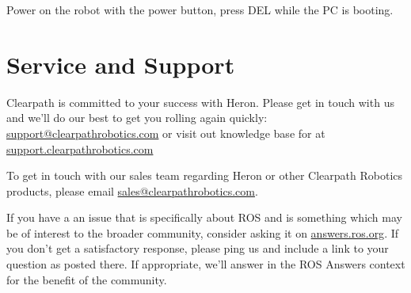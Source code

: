 \documentclass[]{clearpath-latex/clearpath-manual}
\begin{document}
Power on the robot with the power button, press DEL while the PC is booting.

\section{Service and Support}
Clearpath is committed to your success with Heron. Please get in touch with us and we'll
do our best to get you rolling again quickly: \href{mailto:support@clearpathrobotics.com}{support@clearpathrobotics.com}
or visit out knowledge base for at \href{http://support.clearpathrobotics.com}{support.clearpathrobotics.com}

To get in touch with our sales team regarding Heron or other Clearpath Robotics products, please
email \href{mailto:sales@clearpathrobotics.com}{sales@clearpathrobotics.com}.

If you have a an issue that is specifically about ROS and is something which may be of interest
to the broader community, consider asking it on \href{http://answers.ros.org}{answers.ros.org}.
If you don't get a satisfactory response, please ping us and include a link to your question
as posted there. If appropriate, we'll answer in the ROS Answers context for the benefit of the
community.
\end{document}
